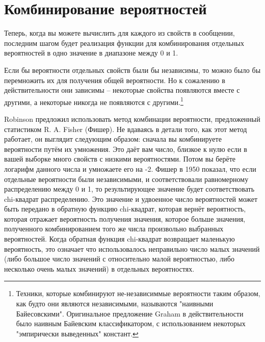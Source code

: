 \section{Комбинирование вероятностей}

Теперь, когда вы можете вычислить  для каждого из свойств
в сообщении, последним шагом будет реализация функции  для комбинирования
отдельных вероятностей в одно значение в диапазоне между 0 и 1.

Если бы вероятности отдельных свойств были бы независимы, то можно было бы перемножить их
для получения общей вероятности.  Но к сожалению в действительности они зависимы --
некоторые свойства появляются вместе с другими, а некоторые никогда не появляются с
другими.\footnote{Техники, которые комбинируют не-независиммые вероятности таким образом,
  как будто они являются независимыми, называются "наивными Байесовскими".  Оригинальное
  предложение Graham в действительности было наивным Байевским классификатором, с
  использованием некоторых "эмпирически выведенных" констант.}

Robinson предложил использовать метод комбинации вероятности, предложенный статистиком
R. A. Fisher (Фишер).  Не вдаваясь в детали того, как этот метод работает, он выглядит
следующим образом: сначала вы комбинируете вероятности путём их умножения.  Это даёт вам
число, близкое к нулю если в вашей выборке много свойств с низкими вероятностями.  Потом
вы берёте логарифм данного числа и умножаете его на -2.  Фишер в 1950 показал, что если
отдельные вероятности были независимыми, и соответствовали равномерному распределению
между 0 и 1, то результирующее значение будет соответствовать chi-квадрат
распределению. Это значение и удвоенное число вероятностей может быть передано в обратную
функцию chi-квадрат, которая вернёт вероятность, которая отражает вероятность получения
значения, которое больше значения, полученного комбинированием того же числа произвольно
выбранных вероятностей.  Когда обратная функция chi-квадрат возвращает маленькую
вероятность, это означает что использовалось неправильно число малых значений (либо
большое число значений с относительно малой вероятностью, либо несколько очень малых
значений) в отдельных вероятностях.

